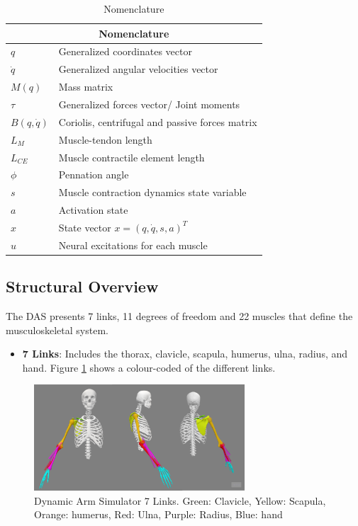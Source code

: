 \begin{table}[h!]
    \centering
    \caption{Nomenclature}
    \label{tab:nomenclature}
    \begin{tabular}{|l l|}
        \hline
        \multicolumn{2}{|c|}{\textbf{Nomenclature}} \\ \hline
        \textbf{$q$} & Generalized coordinates vector \\
        \textbf{$\dot{q}$} & Generalized angular velocities vector \\
        \textbf{$M(q)$} & Mass matrix \\
        \textbf{$\tau$} & Generalized forces vector/ Joint moments \\
        \textbf{$B(q,\dot{q})$} & Coriolis, centrifugal and passive forces matrix \\
        $L_M$ & Muscle-tendon length \\
        $L_{CE}$ & Muscle contractile element length \\
        $\phi$ & Pennation angle \\
        $s$ & Muscle contraction dynamics state variable \\
        $a$ & Activation state \\
       \textbf{$x$} & State vector $x = (q,\dot{q},s,a)^T$ \\
       \textbf{$u$} & Neural excitations for each muscle \\ \hline
    \end{tabular}
\end{table}
\newpage
\subsection{Structural Overview}
The \ac{DAS} presents 7 links, 11 degrees of freedom and 22 muscles that define the musculoskeletal system.
\begin{itemize}
    \item \textbf{7 Links}: Includes the thorax, clavicle, scapula, humerus, ulna, radius, and hand. Figure \ref{fig:links} shows a colour-coded of the different links. 
\end{itemize}

\begin{figure}[h!]
    \centering
    \includegraphics[width=0.7\textwidth]{Pictures/DAS/Links.png}
    \caption{Dynamic Arm Simulator 7 Links. Green: Clavicle, Yellow: Scapula, Orange: humerus, Red: Ulna, Purple: Radius, Blue: hand}
    \label{fig:links}
\end{figure}

